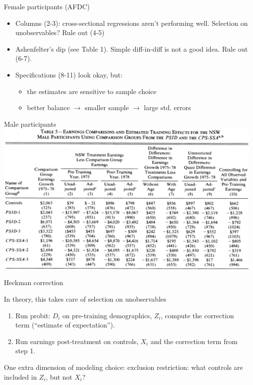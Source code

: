 \documentclass[notes=show,beamer,compress]{beamer}
\begin{document}
\begin{frame}{Female participants (AFDC)}
\begin{itemize}
	\item Columns (2-3): cross-sectional regressions aren't performing well. Selection on unobservables? Rule out (4-5)
	\item Ashenfelter's dip (see Table 1). Simple diff-in-diff is not a good idea. Rule out (6-7).
	\item Specifications (8-11) look okay, but:
		\begin{itemize}
			\item the estimates are sensitive to sample choice
			\item better balance $\to$ smaller sample $\to $ large std. errors
		\end{itemize}
\end{itemize}
\end{frame}

\begin{frame}{Male participants}
\includegraphics[width=1.0\linewidth]{graphs/lalonde86_5.png}
\end{frame}


\begin{frame}{Heckman correction}

In theory, this takes care of selection on unobservables
\begin{enumerate}
	\item Run probit: $D_i$ on pre-training demographics, $Z_{i}$, compute the correction term (``estimate of expectation''). 
	\item Run earnings post-treatment on controls, $X_i$ and the correction term from step 1.
\end{enumerate}

One extra dimension of modeling choice: exclusion restriction: what controls are included in $Z_i$, but not $X_i$?

\end{frame}
\end{document}
